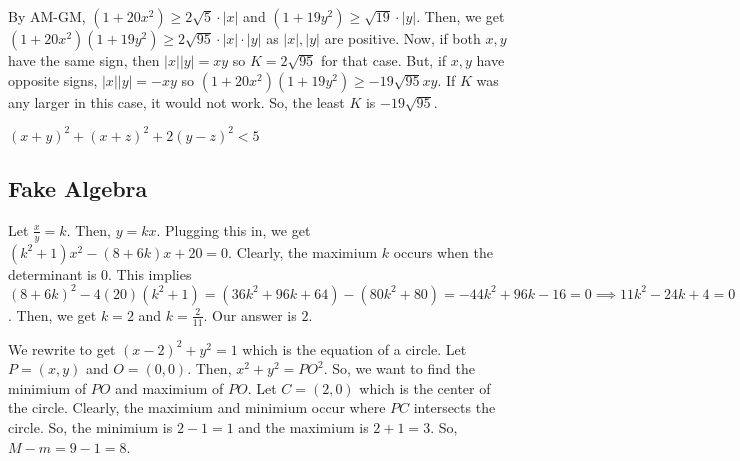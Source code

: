 \documentclass[11pt]{article}
\begin{document}
\begin{sol}
By AM-GM, $(1+20x^2)\ge 2\sqrt{5}\cdot |x|$ and $(1+19y^2)\ge \sqrt{19}\cdot |y|$. Then, we get $(1+20x^2)(1+19y^2)\ge 2\sqrt{95} \cdot |x|\cdot |y|$ as $|x|,|y|$ are positive. Now, if both $x,y$ have the same sign, then $|x||y|=xy$ so $K=2\sqrt{95}$ for that case. But, if $x,y$ have opposite signs, $|x||y|=-xy$ so $(1+20x^2)(1+19y^2)\ge -19\sqrt{95}xy$. If $K$ was any larger in this case, it would not work. So, the least $K$ is $\boxed{-19\sqrt{95}}$.
\end{sol}




\begin{sol}
 $(x+y)^2+(x+z)^2+2(y-z)^2<5$
\end{sol}

\subsection{Fake Algebra}

\begin{sol}
Let $\frac{x}{y}=k$. Then, $y=kx$. Plugging this in, we get $(k^2+1)x^2-(8+6k)x+20=0$. Clearly, the maximium $k$ occurs when the determinant is $0$. This implies $(8+6k)^2-4(20)(k^2+1)=(36k^2+96k+64)-(80k^2+80)=-44k^2+96k-16=0\implies 11k^2-24k+4=0\implies (11k-2)(k-2)=0$. Then, we get $k=2$ and $k=\frac{2}{11}$. Our answer is $\boxed{2}$.
\end{sol}

\begin{sol}
We rewrite to get $(x-2)^2+y^2=1$ which is the equation of a circle. Let $P=(x,y)$ and $O=(0,0)$. Then, $x^2+y^2=PO^2$. So, we want to find the minimium of $PO$ and maximium of $PO$. Let $C=(2,0)$ which is the center of the circle. Clearly, the maximium and minimium occur where $PC$ intersects the circle. So, the minimium is $2-1=1$ and the maximium is $2+1=3$. So, $M-m=9-1=\boxed{8}$.
\end{sol}
\end{document}
